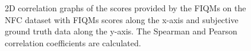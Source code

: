\begin{figure}[h]
\centering
    \caption{2D correlation graphs of the scores provided by the FIQMs on the NFC dataset with FIQMs scores along the x-axis and subjective ground truth data along the y-axis. The Spearman and Pearson correlation coefficients are calculated.}
    \label{fig:ourDS1corr}
\end{figure}

